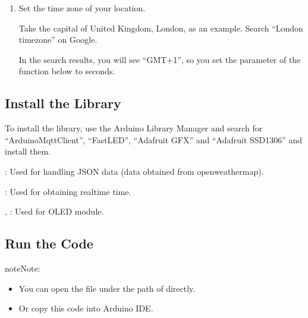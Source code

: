 \documentclass[a4paper,11pt,english]{sphinxmanual}
\begin{document}
\begin{enumerate}
\item {} 
\sphinxAtStartPar
Set the time zone of your location.

\sphinxAtStartPar
Take the capital of United Kingdom, London, as an example. Search “London timezone” on Google.

\noindent{}

\sphinxAtStartPar
In the search results, you will see “GMT+1”, so you set the parameter of the function below to  seconds.

\begin{sphinxVerbatim}[commandchars=\\\{\}]
\end{sphinxVerbatim}

\end{enumerate}


\subsection{Install the Library}
\label{\detokenize{Extension_Project/Real-time_Weather_OLED:install-the-library}}
\sphinxAtStartPar
To install the library, use the Arduino Library Manager and search for “ArduinoMqttClient”, “FastLED”, “Adafruit GFX” and “Adafruit SSD1306” and install them.

\sphinxAtStartPar
{}: Used for handling JSON data (data obtained from openweathermap).

\sphinxAtStartPar
{}: Used for obtaining real\sphinxhyphen{}time time.

\sphinxAtStartPar
{}, : Used for OLED module.


\subsection{Run the Code}
\label{\detokenize{Extension_Project/Real-time_Weather_OLED:run-the-code}}
\begin{sphinxadmonition}{note}{Note:}\begin{itemize}
\item {} 
\sphinxAtStartPar
You can open the file  under the path of  directly.

\item {} 
\sphinxAtStartPar
Or copy this code into Arduino IDE.

\end{itemize}
\end{sphinxadmonition}
\end{document}
